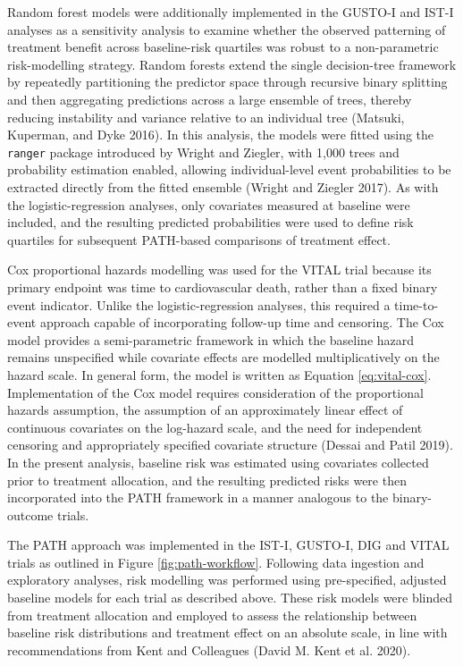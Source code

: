 \documentclass{article}
\begin{document}
Random forest models were additionally implemented in the GUSTO-I and
IST-I analyses as a sensitivity analysis to examine whether the observed
patterning of treatment benefit across baseline-risk quartiles was
robust to a non-parametric risk-modelling strategy. Random forests
extend the single decision-tree framework by repeatedly partitioning the
predictor space through recursive binary splitting and then aggregating
predictions across a large ensemble of trees, thereby reducing
instability and variance relative to an individual tree (Matsuki,
Kuperman, and Dyke 2016). In this analysis, the models were fitted using
the \texttt{ranger} package introduced by Wright and Ziegler, with 1,000
trees and probability estimation enabled, allowing individual-level
event probabilities to be extracted directly from the fitted ensemble
(Wright and Ziegler 2017). As with the logistic-regression analyses,
only covariates measured at baseline were included, and the resulting
predicted probabilities were used to define risk quartiles for
subsequent PATH-based comparisons of treatment effect.

Cox proportional hazards modelling was used for the VITAL trial because
its primary endpoint was time to cardiovascular death, rather than a
fixed binary event indicator. Unlike the logistic-regression analyses,
this required a time-to-event approach capable of incorporating
follow-up time and censoring. The Cox model provides a semi-parametric
framework in which the baseline hazard remains unspecified while
covariate effects are modelled multiplicatively on the hazard scale. In
general form, the model is written as Equation \ref{eq:vital-cox}.
Implementation of the Cox model requires consideration of the
proportional hazards assumption, the assumption of an approximately
linear effect of continuous covariates on the log-hazard scale, and the
need for independent censoring and appropriately specified covariate
structure (Dessai and Patil 2019). In the present analysis, baseline
risk was estimated using covariates collected prior to treatment
allocation, and the resulting predicted risks were then incorporated
into the PATH framework in a manner analogous to the binary-outcome
trials.

The PATH approach was implemented in the IST-I, GUSTO-I, DIG and VITAL
trials as outlined in Figure \ref{fig:path-workflow}. Following data
ingestion and exploratory analyses, risk modelling was performed using
pre-specified, adjusted baseline models for each trial as described
above. These risk models were blinded from treatment allocation and
employed to assess the relationship between baseline risk distributions
and treatment effect on an absolute scale, in line with recommendations
from Kent and Colleagues (David M. Kent et al. 2020).
\end{document}
